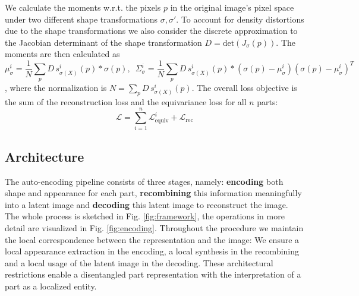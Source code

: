 We calculate the moments w.r.t. the pixels $p$ in the original image's pixel space under two different shape transformations $\sigma, \sigma'$. To account for density distortions due to the shape transformations we also consider the discrete approximation to the Jacobian determinant of the shape transformation $D = \text{det}(J_{\sigma}(p))$. The moments are then calculated as
\begin{equation}
\mu_{\sigma}^i = \frac{1}{N} \sum_{p} D \, s^i_{\sigma(X)}(p) * \sigma(p) \mathrm{,}\,\,\, \Sigma_{\sigma}^i = \frac{1}{N} \sum_{p} D \, s^i_{\sigma(X)}(p) * (\sigma(p) - \mu_\sigma^i) (\sigma(p) - \mu_{\sigma}^i)^T  \nonumber %
\end{equation}
, where the normalization is $N = \sum_{p} D \, s^i_{\sigma(X)}(p)$. The overall loss objective is the sum of the reconstruction loss and the equivariance loss for all $n$ parts:
\begin{equation}
\mathcal{L} = \sum_{i=1}^n \mathcal{L}_{\text{equiv}}^i + \mathcal{L}_{\textrm{rec}}
\end{equation}


\subsection{Architecture}\label{sec:architecture}
The auto-encoding pipeline consists of three stages, namely: \textbf{encoding} both shape and appearance for each part,  \textbf{recombining} this information meaningfully into a latent image and \textbf{decoding} this latent image to reconstruct the image. The whole process is sketched in Fig. \ref{fig:framework}, the operations in more detail are visualized in Fig. \ref{fig:encoding}. Throughout the procedure we maintain the local correspondence between the representation and the image: We ensure a local appearance extraction in the encoding, a local synthesis in the recombining and a local usage of the latent image in the decoding. These architectural restrictions enable a disentangled part representation with the interpretation of a part as a localized entity.
